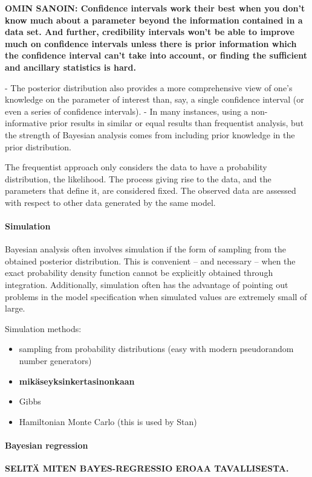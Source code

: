 \textbf{OMIN SANOIN: Confidence intervals work their best when you don't know much about a
parameter beyond the information contained in a data set. And further,
credibility intervals won't be able to improve much on confidence intervals
unless there is prior information which the confidence interval can't take
into account, or finding the sufficient and ancillary statistics is hard.}

- The posterior distribution also provides a more comprehensive view of
one's knowledge on the parameter of interest than, say, a single confidence
interval (or even a series of confidence intervals).
- In many instances, using a non-informative prior results in similar or
equal results than frequentist analysis, but the strength of Bayesian
analysis comes from including prior knowledge in the prior distribution. \citep{Jaynes?}

The frequentist approach only considers the data to have a probability
distribution, the likelihood. The process giving rise to the data, and the
parameters that define it, are considered fixed. The observed data are
assessed with respect to other data generated by the same model.




\paragraph{Simulation}\label{simulation}

Bayesian analysis often involves simulation if the form of sampling from the
obtained posterior distribution. This is convenient -- and necessary -- when
the exact probability density function cannot be explicitly obtained through
integration. Additionally, simulation often has the advantage of pointing out
problems in the model specification when simulated values are extremely small
of large.

Simulation methods:
\begin{itemize}
  \item
  sampling from probability distributions (easy with modern pseudorandom
  number generators)
  \item
  \textbf{mikäseyksinkertasinonkaan}
  \item
  Gibbs
  \item
  Hamiltonian Monte Carlo (this is used by Stan)
\end{itemize}


\paragraph{Bayesian regression}\label{bayesian-regression}

\textbf{SELITÄ MITEN BAYES-REGRESSIO EROAA TAVALLISESTA.}
